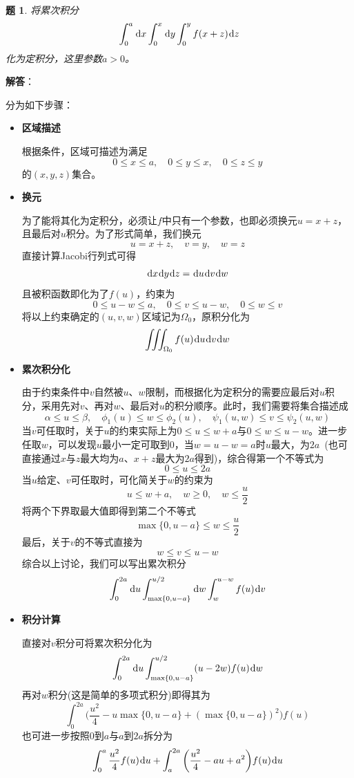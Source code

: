 \documentclass[a4paper,UTF8,fontset=windows,AutoFakeBold]{ctexart}
\newcommand*{\dr}{\hspace{0.07em}\mathrm{d}}
\theoremstyle{ex}
\newtheorem{exercise}{题}
\newcommand{\sol}[1]{{\vspace{5pt}\kaishu\noindent\textbf{解答}：\vspace{-3pt}
\begin{compactitem}
    \item[] #1
\end{compactitem}
}}
\begin{document}
\begin{framed}
\begin{exercise}
    将累次积分
    $$\int_0^a\dr x\int_0^x\dr y\int_0^yf(x+z)\dr z$$
    化为定积分，这里参数$a>0$。
\end{exercise}
\sol{
    分为如下步骤：
    \begin{itemize}
        \item \textbf{区域描述}
        
        根据条件，区域可描述为满足
        $$0\le x\le a,\quad0\le y\le x,\quad 0\le z\le y$$
        的$(x,y,z)$集合。

        \item \textbf{换元}
        
        为了能将其化为定积分，必须让$f$中只有一个参数，也即必须换元$u=x+z$，且最后对$u$积分。为了形式简单，我们换元
        $$u=x+z,\quad v=y,\quad w=z$$
        直接计算Jacobi行列式可得
        $$\dr x\dr y\dr z=\dr u\dr v\dr w$$
        且被积函数即化为了$f(u)$，约束为
        $$0\le u-w\le a,\quad 0\le v\le u-w,\quad 0\le w\le v$$
        将以上约束确定的$(u,v,w)$区域记为$\Omega_0$，原积分化为
        $$\iiint_{\Omega_0}f(u)\dr u\dr v\dr w$$

        \item \textbf{累次积分化}
        
        由于约束条件中$v$自然被$u$、$w$限制，而根据化为定积分的需要应最后对$u$积分，采用先对$v$、再对$w$、最后对$u$的积分顺序。此时，我们需要将集合描述成
        $$\alpha\le u\le\beta,\quad\phi_1(u)\le w\le\phi_2(u),\quad\psi_1(u,w)\le v\le\psi_2(u,w)$$
        当$v$可任取时，关于$u$的约束实际上为$0\le u\le w+a$与$0\le w\le u-w$。进一步任取$w$，可以发现$u$最小一定可取到0，当$w=u-w=a$时$u$最大，为$2a$\ (也可直接通过$x$与$z$最大均为$a$、$x+z$最大为$2a$得到)，综合得第一个不等式为
        $$0\le u\le 2a$$
        当$u$给定、$v$可任取时，可化简关于$w$的约束为
        $$u\le w+a,\quad w\ge0,\quad w\le\frac{u}{2}$$
        将两个下界取最大值即得到第二个不等式
        $$\max\{0,u-a\}\le w\le\frac{u}{2}$$
        最后，关于$v$的不等式直接为
        $$w\le v\le u-w$$
        综合以上讨论，我们可以写出累次积分
        $$\int_0^{2a}\dr u\int_{\max\{0,u-a\}}^{u/2}\dr w\int_w^{u-w}f(u)\dr v$$

        \item \textbf{积分计算}

        直接对$v$积分可将累次积分化为
        $$\int_0^{2a}\dr u\int_{\max\{0,u-a\}}^{u/2}(u-2w)f(u)\dr w$$
        再对$w$积分(这是简单的多项式积分)即得其为
        $$\int_0^{2a}\bigg(\frac{u^2}{4}-u\max\{0,u-a\}+(\max\{0,u-a\})^2\bigg)f(u)$$
        也可进一步按照0到$a$与$a$到$2a$拆分为
        $$\int_0^a\frac{u^2}{4}f(u)\dr u+\int_a^{2a}\bigg(\frac{u^2}{4}-au+a^2\bigg)f(u)\dr u$$
    \end{itemize}
}
\end{framed}
\end{document}
